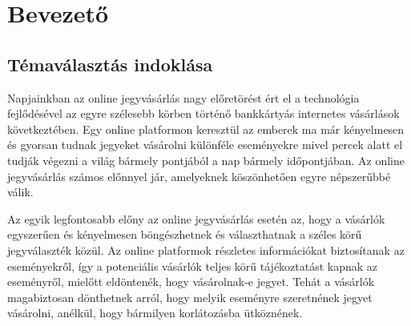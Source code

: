 \chapter{Bevezető}%


\section {Témaválasztás indoklása}

Napjainkban az online jegyvásárlás nagy előretörést ért el a technológia fejlődésével az egyre szélesebb körben történő bankkártyás internetes vásárlások következtében. Egy online platformon keresztül az emberek ma már kényelmesen és gyorsan tudnak jegyeket vásárolni különféle eseményekre mivel percek alatt el tudják végezni a világ bármely pontjából a nap bármely időpontjában. Az online jegyvásárlás számos előnnyel jár, amelyeknek köszönhetően egyre népszerűbbé válik.

Az egyik legfontosabb előny az online jegyvásárlás esetén az, hogy a vásárlók egyszerűen és kényelmesen böngészhetnek és választhatnak a széles körű jegyválaszték közül. Az online platformok részletes információkat biztosítanak az eseményekről, így a potenciális vásárlók teljes körű tájékoztatást kapnak az eseményről, mielőtt eldöntenék, hogy vásárolnak-e jegyet. Tehát a vásárlók magabiztosan dönthetnek arról, hogy melyik eseményre szeretnének jegyet vásárolni, anélkül, hogy bármilyen korlátozásba ütköznének.


